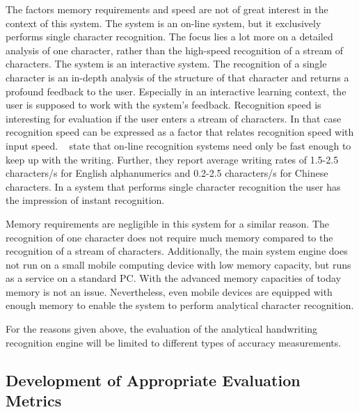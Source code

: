 The factors memory requirements and speed are not of great interest in
the context of this system. The system is an on-line system, but it
exclusively performs single character recognition. The focus lies a lot more on
a detailed analysis of one character, rather than the high-speed recognition
of a stream of characters. The system is an interactive system. 
The recognition of a single character is an in-depth analysis of the
structure of that character and returns a profound feedback to the user.
Especially in an interactive learning context, the user is supposed to
work with the system's feedback. Recognition speed is interesting for evaluation
if the user enters a stream of characters. In that case recognition speed
can be expressed as a factor that relates recognition speed with input speed.
~\citeyear{Tappert1990} state that on-line
recognition systems need only be fast enough to keep up with the writing. 
Further, they report average writing rates of  1.5-2.5  characters/s  for 
English  alphanumerics  and 0.2-2.5  characters/s  for  Chinese  characters.  
In a system that performs single character recognition the user has the 
impression of instant recognition.

Memory requirements are negligible in this system for a similar reason.
The recognition of one character does not require much memory compared to
the recognition of a stream of characters. Additionally, the main system engine
does not run on a small mobile computing device with low memory capacity,
but runs as a service on a standard PC. With the advanced memory capacities
of today memory is not an issue. Nevertheless, even mobile devices are 
equipped with enough memory to enable the system to perform analytical character
recognition.

For the reasons given above, the evaluation of the analytical handwriting 
recognition engine will be limited to different types of accuracy measurements.

\subsection{Development of Appropriate Evaluation Metrics}
\label{sec:eval:developmentofevalmetrics}


